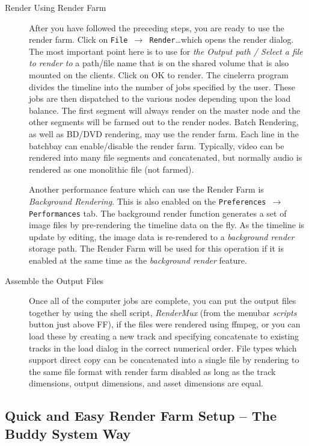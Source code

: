 \begin{description}
    \item[Render Using Render Farm] After you have followed the preceding steps, you are ready to use the render farm.  Click on \texttt{File $\rightarrow$ Render}\dots which opens the render dialog.  The most important point here is to use for \textit{the Output path / Select a file to render to} a path/file name that is on the shared volume that is also mounted on the clients.  Click on OK to render. The cinelerra program divides the timeline into the number of jobs specified by the user.  These jobs are then dispatched to the various nodes depending upon the load balance. The first segment will always render on the master node and the other segments will be farmed out to the render nodes.  Batch Rendering, as well as BD/DVD rendering, may use the render farm.  Each line in the batchbay can enable/disable the render farm.  Typically, video can be rendered into many file segments and concatenated, but normally audio is rendered as one monolithic file (not farmed).
    
    Another performance feature which can use the Render Farm is \textit{Background Rendering}.  This is also enabled on the \texttt{Preferences $\rightarrow$ Performances} tab.  The background render function generates a set of image files by pre-rendering the timeline data on the fly.  As the timeline is update by editing, the image data is re-rendered to a \textit{background render} storage path.  The Render Farm will be used for this operation if it is enabled at the same time as the \textit{background render} feature.
    \item[Assemble the Output Files] Once all of the computer jobs are complete, you can put the output files together by using the shell script, \textit{RenderMux} (from the menubar \textit{scripts} button just above FF), if the files were rendered using ffmpeg, or you can load these by creating a new track and specifying concatenate to existing tracks in the load dialog in the correct numerical order.  File types which support direct copy can be concatenated into a single file by rendering to the same file format with render farm disabled as long as the track dimensions, output dimensions, and asset dimensions are equal.
\end{description}

\subsection{Quick and Easy Render Farm Setup – The Buddy System Way}%
\label{sub:buddy_system_way}

